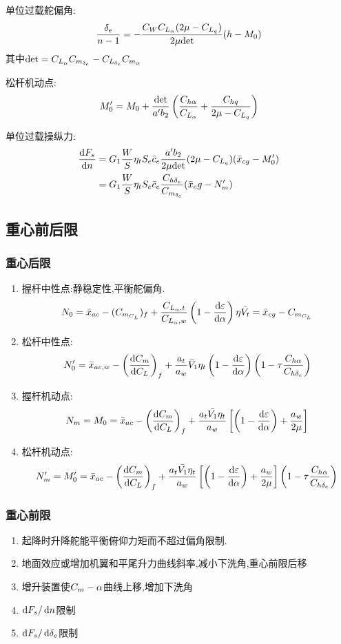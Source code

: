 单位过载舵偏角:
$$\frac{\delta_e}{n-1}=-\frac{C_W{C_{L_\alpha}}(2\mu-{C_{L_q}})}{2\mu\mathrm{det}}(h-M_0)$$
其中$\mathrm{det}={C_{L_\alpha}}C_{m_{\delta_e}}-{C_{L_{\delta_e}}}{C_{m_\alpha}}$

松杆机动点:
$$M'_0=M_0+\frac{\mathrm{det}}{a'b_2}\left( \frac{C_{h\alpha}}{{C_{L_\alpha}}}+\frac{C_{hq}}{2\mu-{C_{L_q}}}\right)$$

单位过载操纵力:
$$
\begin{aligned}
\frac{\operatorname{d\!} F_s}{\operatorname{d\!} n}&=G_1 \frac{W}{S}\eta_tS_e\bar{c}_e\frac{a'b_2}{2\mu \mathrm{det}}(2\mu-{C_{L_q}})(\bar{x}_{cg}-M'_0)\\
&=G_1 \frac{W}{S}\eta_tS_e\bar{c}_e\frac{C_{h\delta_e}}{C_{m_{\delta_e}}}(\bar{x}_cg-N'_m)
\end{aligned}
$$

\subsection{重心前后限}
\subsubsection{重心后限}
\begin{enumerate}[label=\arabic*.,topsep=0pt]
\setlength{\itemsep}{-2pt}
\item 握杆中性点:静稳定性,平衡舵偏角.
$$N_0=\bar{x}_{ac}-({C_{m_{C_L}}})_f+\frac{C_{L_\alpha,t}}{C_{L_\alpha,w}}\left(1-\frac{\operatorname{d\!} {\varepsilon}}{\operatorname{d\!} \alpha}\right)\eta\bar{V_t}=\bar{x}_{cg}-{C_{m_{C_L}}}$$
\item 松杆中性点:
$$N_0'=\bar{x}_{ac,w}-\left(\frac{\operatorname{d\!} {C_m}}{\operatorname{d\!} {C_L}}\right)_f+\frac{a_t}{a_w}\bar{V}_1 \eta_t\left(1-\frac{\operatorname{d\!} {\varepsilon}}{\operatorname{d\!} \alpha}\right)\left(1-\tau\frac{C_{h\alpha}}{C_{h\delta_e}}\right)$$
\item 握杆机动点:
$$N_m=M_0=\bar{x}_{ac}-\left( \frac{\operatorname{d\!} {C_m}}{\operatorname{d\!} {C_L}}\right)_f+\frac{a_t\bar{V_1}\eta_t}{a_w}\left[\left(1-\frac{\operatorname{d\!} {\varepsilon}}{\operatorname{d\!} \alpha}\right)+\frac{a_w}{2\mu}\right]$$
\item 松杆机动点:
$$N'_m=M'_0=\bar{x}_{ac}-\left( \frac{\operatorname{d\!} {C_m}}{\operatorname{d\!} {C_L}}\right)_f+\frac{a_t\bar{V_1}\eta_t}{a_w}\left[\left(1-\frac{\operatorname{d\!} {\varepsilon}}{\operatorname{d\!} \alpha}\right)+\frac{a_w}{2\mu}\right]\left(1-\tau \frac{C_{h\alpha}}{C_{h\delta_e}}\right)$$

\end{enumerate}

\subsubsection{重心前限}
\begin{enumerate}[label=\arabic*.,topsep=0pt]
\setlength{\itemsep}{-2pt}
\item 起降时升降舵能平衡俯仰力矩而不超过偏角限制.
\item 地面效应或增加机翼和平尾升力曲线斜率,减小下洗角,重心前限后移
\item 增升装置使${C_m}-\alpha$曲线上移,增加下洗角
\item $\operatorname{d\!} F_s/\operatorname{d\!} n$限制
\item $\operatorname{d\!} F_s/\operatorname{d\!} \delta_e$限制
\end{enumerate}
